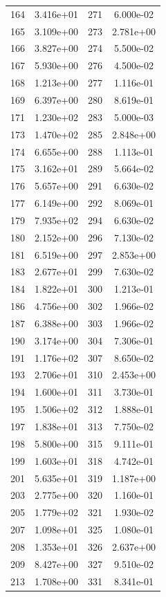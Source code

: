 \documentclass[12pt]{article}
\begin{document}
\begin{longtable}{@{}cccc@{}}
164 & 3.416e+01 & 271 & 6.000e-02 \\
165 & 3.109e+00 & 273 & 2.781e+00 \\
166 & 3.827e+00 & 274 & 5.500e-02 \\
167 & 5.930e+00 & 276 & 4.500e-02 \\
168 & 1.213e+00 & 277 & 1.116e-01 \\
169 & 6.397e+00 & 280 & 8.619e-01 \\
171 & 1.230e+02 & 283 & 5.000e-03 \\
173 & 1.470e+02 & 285 & 2.848e+00 \\
174 & 6.655e+00 & 288 & 1.113e-01 \\
175 & 3.162e+01 & 289 & 5.664e-02 \\
176 & 5.657e+00 & 291 & 6.630e-02 \\
177 & 6.149e+00 & 292 & 8.069e-01 \\
179 & 7.935e+02 & 294 & 6.630e-02 \\
180 & 2.152e+00 & 296 & 7.130e-02 \\
181 & 6.519e+00 & 297 & 2.853e+00 \\
183 & 2.677e+01 & 299 & 7.630e-02 \\
184 & 1.822e+01 & 300 & 1.213e-01 \\
186 & 4.756e+00 & 302 & 1.966e-02 \\
187 & 6.388e+00 & 303 & 1.966e-02 \\
190 & 3.174e+00 & 304 & 7.306e-01 \\
191 & 1.176e+02 & 307 & 8.650e-02 \\
193 & 2.706e+01 & 310 & 2.453e+00 \\
194 & 1.600e+01 & 311 & 3.730e-01 \\
195 & 1.506e+02 & 312 & 1.888e-01 \\
197 & 1.838e+01 & 313 & 7.750e-02 \\
198 & 5.800e+00 & 315 & 9.111e-01 \\
199 & 1.603e+01 & 318 & 4.742e-01 \\
201 & 5.635e+01 & 319 & 1.187e+00 \\
203 & 2.775e+00 & 320 & 1.160e-01 \\
205 & 1.779e+02 & 321 & 1.930e-02 \\
207 & 1.098e+01 & 325 & 1.080e-01 \\
208 & 1.353e+01 & 326 & 2.637e+00 \\
209 & 8.427e+00 & 327 & 9.510e-02 \\
213 & 1.708e+00 & 331 & 8.341e-01 \\

\end{longtable}
\end{document}
